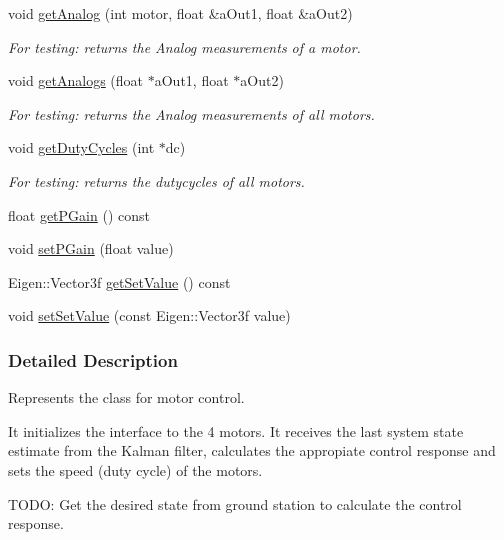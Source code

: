 \begin{DoxyCompactItemize}
void \hyperlink{class_u_s_u_1_1_motor_control_a3304fd7022bf2468859a0d2edae0e2f0}{get\-Analog} (int motor, float \&a\-Out1, float \&a\-Out2)
\begin{DoxyCompactList}\small\item\em \-For testing\-: returns the \-Analog measurements of a motor. \end{DoxyCompactList}\item 
void \hyperlink{class_u_s_u_1_1_motor_control_a195cfcad9f3e9ca8cbde54340aad620c}{get\-Analogs} (float $\ast$a\-Out1, float $\ast$a\-Out2)
\begin{DoxyCompactList}\small\item\em \-For testing\-: returns the \-Analog measurements of all motors. \end{DoxyCompactList}\item 
void \hyperlink{class_u_s_u_1_1_motor_control_a16a8f713f050fffc56321f82267bc7cc}{get\-Duty\-Cycles} (int $\ast$dc)
\begin{DoxyCompactList}\small\item\em \-For testing\-: returns the dutycycles of all motors. \end{DoxyCompactList}\item 
float \hyperlink{class_u_s_u_1_1_motor_control_ad4cb1e34afc71cbd161c66d4794784cc}{get\-P\-Gain} () const 
\item 
void \hyperlink{class_u_s_u_1_1_motor_control_a0a959a8b3ab68e7ad095dcab4059d469}{set\-P\-Gain} (float value)
\item 
\-Eigen\-::\-Vector3f \hyperlink{class_u_s_u_1_1_motor_control_a849e3f3b265777135492c2ebfc3fe814}{get\-Set\-Value} () const 
\item 
void \hyperlink{class_u_s_u_1_1_motor_control_a9de3a4f1b2e39e1f4cfb3e822d5d74bc}{set\-Set\-Value} (const \-Eigen\-::\-Vector3f value)
\end{DoxyCompactItemize}


\subsubsection{\-Detailed \-Description}
\-Represents the class for motor control. 

\-It initializes the interface to the 4 motors. \-It receives the last system state estimate from the \-Kalman filter, calculates the appropiate control response and sets the speed (duty cycle) of the motors.

\-T\-O\-D\-O\-: \-Get the desired state from ground station to calculate the control response. 

